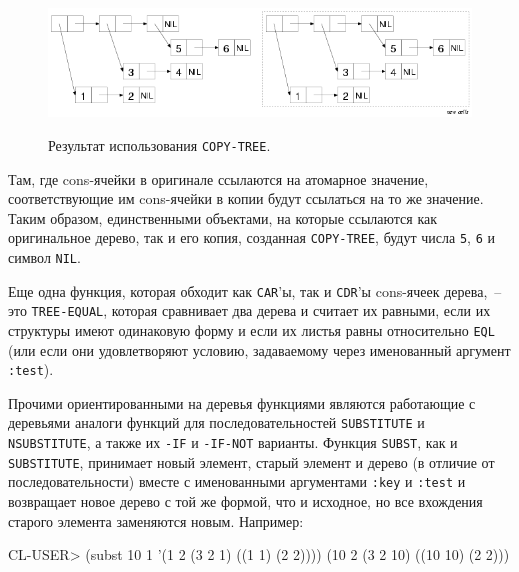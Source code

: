 \begin{figure}[h]
  \centering
  \includegraphics[scale=0.6]{images/copy-tree-list-or-tree.png}
  \label{fig13:3}
  \caption{Результат использования \lstinline{COPY-TREE}.}
\end{figure}

Там, где cons-ячейки в оригинале ссылаются на атомарное значение, соответствующие им
cons-ячейки в копии будут ссылаться на то же значение.  Таким образом, единственными
объектами, на которые ссылаются как оригинальное дерево, так и его копия, созданная
\lstinline{COPY-TREE}, будут числа \lstinline{5}, \lstinline{6} и символ \lstinline{NIL}.

Еще одна функция, которая обходит как \lstinline{CAR}'ы, так и \lstinline{CDR}'ы cons-ячеек дерева,~--
это \lstinline{TREE-EQUAL}, которая сравнивает два дерева и считает их равными, если их
структуры имеют одинаковую форму и если их листья равны относительно \lstinline{EQL} (или если
они удовлетворяют условию, задаваемому через именованный аргумент \lstinline{:test}).

Прочими ориентированными на деревья функциями являются работающие с деревьями аналоги
функций для последовательностей \lstinline{SUBSTITUTE} и \lstinline{NSUBSTITUTE}, а также их \lstinline{-IF} и
\lstinline{-IF-NOT} варианты. Функция \lstinline{SUBST}, как и \lstinline{SUBSTITUTE}, принимает новый
элемент, старый элемент и дерево (в отличие от последовательности) вместе с именованными
аргументами \lstinline{:key} и \lstinline{:test} и возвращает новое дерево с той же формой, что и
исходное, но все вхождения старого элемента заменяются новым. Например:

\begin{myverb}
CL-USER> (subst 10 1 '(1 2 (3 2 1) ((1 1) (2 2))))
(10 2 (3 2 10) ((10 10) (2 2)))
\end{myverb}

